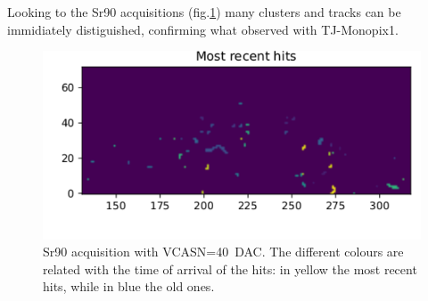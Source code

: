     Looking to the Sr90 acquisitions (fig.\ref{fig:ARCADIA_Sr90}) many clusters and tracks can be immidiately distiguished, confirming what observed with TJ-Monopix1. 
    \begin{figure}[h!]
        \centering
        \includegraphics[width=.7\linewidth]{figures/charaterization/ARCADIA/Sr90_2min.pdf}
        \caption{Sr90 acquisition with VCASN=\SI{40}{DAC}. The different colours are related with the time of arrival of the hits: in yellow the most recent hits, while in blue the old ones.}
        \label{fig:ARCADIA_Sr90}
    \end{figure}  





